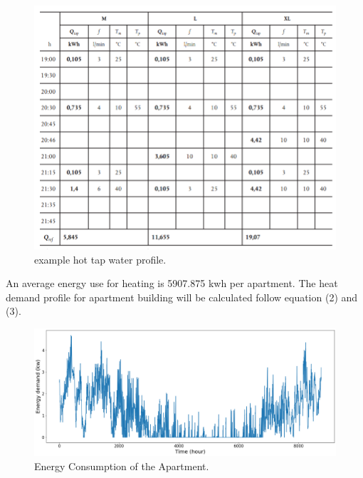 \documentclass[a4paper,10pt]{article}
\begin{document}
\begin{figure}[H]
\centering
\includegraphics[width=1\columnwidth]{pictures/hot tap water.png}
\caption[Short title]{example hot tap water profile.}
\label{fig:ff5}\end{figure}




An average energy use for heating is 5907.875 kwh per apartment. The heat demand profile for apartment building will be calculated follow equation (2) and (3). 

\begin{figure}[H]
\centering
\includegraphics[width=1\columnwidth]{pictures/Apartment_profile.png}
\caption[Short title]{Energy Consumption of the Apartment.}
\label{fig:ff6}\end{figure}
\end{document}
